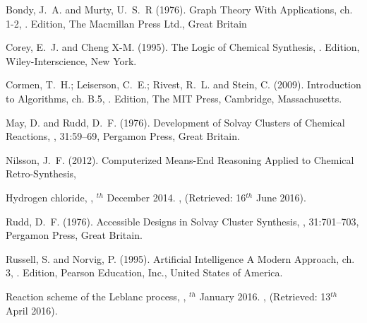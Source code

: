 \begin{thebibliography}{9} %

    Bondy, J.~A. and Murty, U.~S.~R (1976).
    \newblock Graph Theory With Applications,
    \newblock ch. 1-2,
    . Edition,
    \newblock The Macmillan Press Ltd., Great Britain
    
    Corey, E.~J. and Cheng X-M. (1995).
    \newblock The Logic of Chemical Synthesis,
    . Edition,
    \newblock Wiley-Interscience, New York.
    
    Cormen, T.~H.; Leiserson, C.~E.; Rivest, R.~L. and Stein, C. (2009).
    \newblock Introduction to Algorithms,
    \newblock ch. B.5,
    . Edition,
    \newblock The MIT Press, Cambridge, Massachusetts.

    May, D. and Rudd, D.~F. (1976).
    \newblock Development of Solvay Clusters of Chemical Reactions,
    , 31:59--69,
    \newblock Pergamon Press, Great Britain.

    Nilsson, J.~F. (2012).
    \newblock Computerized Means-End Reasoning Applied to Chemical Retro-Synthesis,
    
    \newblock Hydrogen chloride,
    ,
    $^{th}$ December 2014.
    ,
    \newblock (Retrieved: 16$^{th}$ June 2016).

    Rudd, D.~F. (1976).
    \newblock Accessible Designs in Solvay Cluster Synthesis,
    , 31:701--703,
    \newblock Pergamon Press, Great Britain.

    Russell, S. and Norvig, P. (1995).
    \newblock Artificial Intelligence A Modern Approach,
    \newblock ch. 3,
    . Edition,
    \newblock Pearson Education, Inc., United States of America.

    \newblock Reaction scheme of the Leblanc process,
    ,
    $^{th}$ January 2016.
    ,
    \newblock (Retrieved: 13$^{th}$ April 2016).
\end{thebibliography}